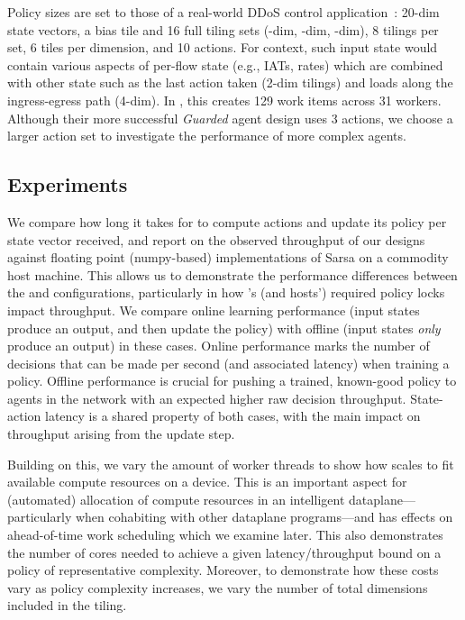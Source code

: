 Policy sizes are set to those of a real-world DDoS control application~\parencite{DBLP:journals/tnsm/SimpsonRP20}: 20-dim state vectors, a bias tile and 16 full tiling sets (-dim, -dim, -dim), 8 tilings per set, 6 tiles per dimension, and 10 actions.
For context, such input state would contain various aspects of per-flow state (e.g., IATs, rates) which are combined with other state such as the last action taken (2-dim tilings) and loads along the ingress-egress path (4-dim).
In \Coopfw{}, this creates \num{129} work items across \num{31} workers.
Although their more successful \emph{Guarded} agent design uses 3 actions, we choose a larger action set to investigate the performance of more complex agents.


\subsection{Experiments}

We compare how long it takes for \approachshort{} to compute actions and update its policy per state vector received, and report on the observed throughput of our designs against floating point (numpy-based) implementations of Sarsa on a commodity host machine.
This allows us to demonstrate the performance differences between the \indfw{} and \coopfw{} configurations, particularly in how \indfw's (and hosts') required policy locks impact throughput.
We compare online learning performance (input states produce an output, and then update the policy) with offline (input states \emph{only} produce an output) in these cases.
Online performance marks the number of decisions that can be made per second (and associated latency) when training a policy.
Offline performance is crucial for pushing a trained, known-good policy to agents in the network with an expected higher raw decision throughput.
State-action latency is a shared property of both cases, with the main impact on throughput arising from the update step.

Building on this, we vary the amount of worker threads to show how \approachshort{} scales to fit available compute resources on a device.
This is an important aspect for (automated) allocation of compute resources in an intelligent dataplane---particularly when cohabiting with other dataplane programs---and has effects on ahead-of-time work scheduling which we examine later.
This also demonstrates the number of cores needed to achieve a given latency/throughput bound on a policy of representative complexity.
Moreover, to demonstrate how these costs vary as policy complexity increases, we vary the number of total dimensions included in the tiling.


